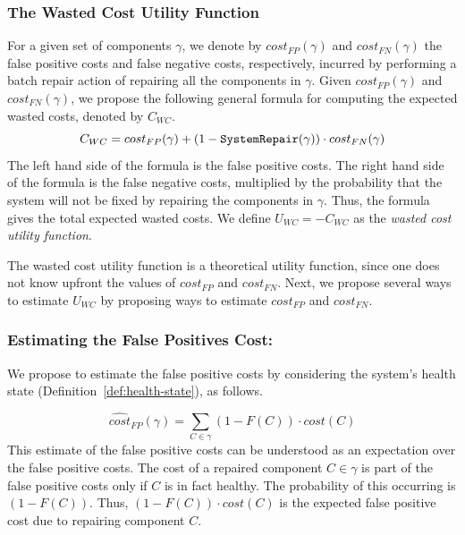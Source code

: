 \documentclass[review]{elsarticle}
\newcommand\sysrep[1]{{\tt SystemRepair(#1)}}
\begin{document}
\subsubsection{The Wasted Cost Utility Function}
For a given set of components $\gamma$, we denote by $cost_{FP}(\gamma)$ and $cost_{FN}(\gamma)$ the false positive costs and false negative costs, respectively, incurred by performing a batch repair action of repairing all the components in $\gamma$. Given $cost_{FP}(\gamma)$ and $cost_{FN}(\gamma)$, we propose the following general formula for computing the expected wasted costs, denoted by $C_{WC}$.
\[ C_{WC}=cost_{FP}(\gamma)+(1-\sysrep{\gamma})\cdot cost_{FN}(\gamma)\]
The left hand side of the formula is the false positive costs. The right hand side of the formula is the false negative costs, multiplied by the probability that the system will not be fixed by repairing the components in $\gamma$. Thus, the formula gives the total expected wasted costs.
We define $U_{WC}=-C_{WC}$ as the {\em wasted cost utility function}.



The wasted cost utility function is a theoretical utility function, since one does not know upfront the values of $cost_{FP}$ and $cost_{FN}$. Next, we propose several ways to estimate $U_{WC}$ by proposing ways to estimate $cost_{FP}$ and $cost_{FN}$.


\subsubsection{Estimating the False Positives Cost:}
We propose to estimate the false positive costs by considering the system's health state (Definition~\ref{def:health-state}), as follows.

\[ \widehat{cost}_{FP}(\gamma)=\sum_{C\in \gamma} (1-F(C))\cdot cost(C) \]
This estimate of the false positive costs can be understood as an expectation over the false positive costs. The cost of a repaired component $C\in\gamma$ is part of the false positive costs only if $C$ is in fact healthy. The probability of this occurring is $(1-F(C))$. Thus, $(1-F(C))\cdot cost(C)$ is the expected false positive cost due to repairing component $C$.
\end{document}
